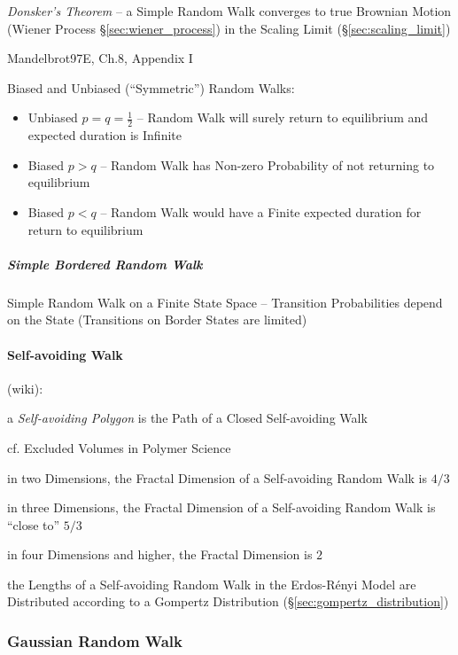\emph{Donsker's Theorem} -- a Simple Random Walk converges to true Brownian
Motion (Wiener Process \S\ref{sec:wiener_process}) in the Scaling Limit
(\S\ref{sec:scaling_limit})

\asterism

Mandelbrot97E, Ch.8, Appendix I

Biased and Unbiased (``Symmetric'') Random Walks:
\begin{itemize}
  \item Unbiased $p = q = \frac{1}{2}$ -- Random Walk will surely return to
    equilibrium and expected duration is Infinite
  \item Biased $p > q$ -- Random Walk has Non-zero Probability of not returning
    to equilibrium
  \item Biased $p < q$ -- Random Walk would have a Finite expected duration for
    return to equilibrium
\end{itemize}



\subparagraph{Simple Bordered Random Walk}\label{sec:simple_bordered_walk}\hfill

Simple Random Walk on a Finite State Space -- Transition Probabilities depend on
the State (Transitions on Border States are limited)



\paragraph{Self-avoiding Walk}\label{sec:selfavoiding_walk}\hfill

(wiki):

a \emph{Self-avoiding Polygon} is the Path of a Closed Self-avoiding Walk

cf. Excluded Volumes in Polymer Science

in two Dimensions, the Fractal Dimension of a Self-avoiding Random Walk is $4/3$

in three Dimensions, the Fractal Dimension of a Self-avoiding Random Walk is
``close to'' $5/3$

in four Dimensions and higher, the Fractal Dimension is $2$

the Lengths of a Self-avoiding Random Walk in the Erdos-R\'enyi Model are
Distributed according to a Gompertz Distribution
(\S\ref{sec:gompertz_distribution})



\subsubsection{Gaussian Random Walk}\label{sec:gaussian_random_walk}

